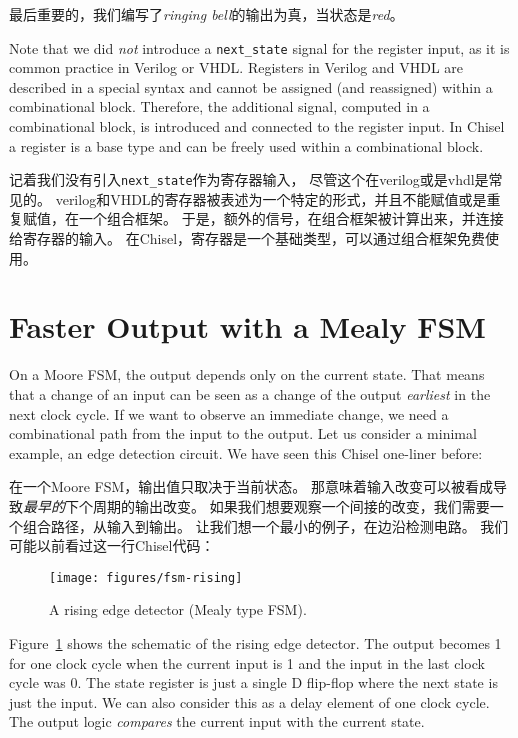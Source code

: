 \documentclass[%
    10pt,
    headinclude, footexclude,
    openright, %
    notitlepage,
    cleardoubleempty,
    headsepline,
    pointlessnumbers,
    bibtotoc, idxtotoc,
    ]{scrbook}
\newcommand{\code}[1]{{\small{\texttt{#1}}}}
\newcommand{\scale}{0.7}
\begin{document}
\noindent 最后重要的，我们编写了\emph{ringing bell}的输出为真，当状态是\emph{red}。


Note that we did \emph{not} introduce a \code{next\_state} signal for the register input,
as it is common practice in Verilog or VHDL.
Registers in Verilog and VHDL are described in a special syntax and cannot
be assigned (and reassigned) within a combinational block.
Therefore, the additional signal, computed in a combinational block, is
introduced and connected to the register input.
In Chisel a register is a base type and can be freely used within a combinational block.

记着我们没有引入\code{next\_state}作为寄存器输入，
尽管这个在verilog或是vhdl是常见的。
verilog和VHDL的寄存器被表述为一个特定的形式，并且不能赋值或是重复赋值，在一个组合框架。
于是，额外的信号，在组合框架被计算出来，并连接给寄存器的输入。
在Chisel，寄存器是一个基础类型，可以通过组合框架免费使用。

\section{Faster Output with a Mealy FSM}

On a Moore FSM, the output depends only on the current state.
That means that a change of an input can be seen as a change of the
output \emph{earliest} in the next clock cycle.
If we want to observe an immediate change, we need a combinational
path from the input to the output.
Let us consider a minimal example, an edge detection circuit.
We have seen this Chisel one-liner before:

在一个Moore FSM，输出值只取决于当前状态。
那意味着输入改变可以被看成导致\emph{最早的}下个周期的输出改变。
如果我们想要观察一个间接的改变，我们需要一个组合路径，从输入到输出。
让我们想一个最小的例子，在边沿检测电路。
我们可能以前看过这一行Chisel代码：


\begin{figure}
  \centering
  \texttt{[image: figures/fsm-rising]}
  \caption{A rising edge detector (Mealy type FSM).}
  \label{fig:fsm-rising}
\end{figure}

Figure~\ref{fig:fsm-rising} shows the schematic of the rising edge detector.
The output becomes 1 for one clock cycle when the current input is 1
and the input in the last clock cycle was 0.
The state register is just a single D flip-flop where the next state
is just the input. We can also consider this as a delay element of one
clock cycle. The output logic \emph{compares} the current
input with the current state.
\end{document}
